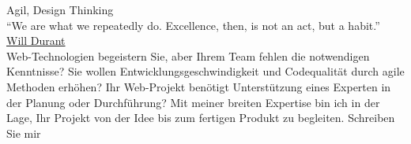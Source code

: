 \documentclass[9pt]{developercv} %
\begin{document}
\vspace{0.5cm}



\begin{minipage}[t]{0.4\textwidth} %
	\vspace{-\baselineskip} %
  
  Agil, Design Thinking\\
  \enquote{We are what we repeatedly do. Excellence, then, is not an act, but a habit.}\\
  \href{https://medium.com/the-mission/my-favourite-quote-of-all-time-is-a-misattribution-66356f22843d}{Will Durant}\\
  Web-Technologien begeistern Sie, aber Ihrem Team fehlen die notwendigen Kenntnisse?
 Sie wollen Entwicklungsgeschwindigkeit und Codequalität durch agile Methoden erhöhen?
 Ihr Web-Projekt benötigt Unterstützung eines Experten in der Planung oder Durchführung?
Mit meiner breiten Expertise bin ich in der Lage, Ihr Projekt von der Idee bis zum fertigen Produkt zu
begleiten. Schreiben Sie mir

\end{minipage}
\hfill %
\begin{minipage}[t]{0.5\textwidth} %
	\vspace{-\baselineskip} %
	\begin{barchart}{5.5}
	\end{barchart}
\end{minipage}

\begin{center}
\end{center}


\end{document}
